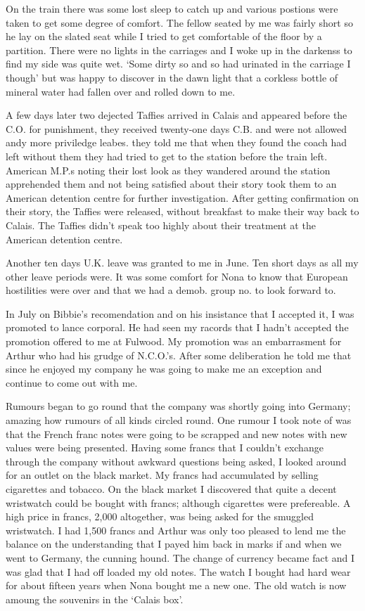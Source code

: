 On the train there was some lost sleep to catch up and various
postions were taken to get some degree of comfort. The fellow seated
by me was fairly short so he lay on the slated seat while I tried to
get comfortable of the floor by a partition. There were no lights in
the carriages and I woke up in the darkenss to find my side was quite
wet. `Some dirty so and so had urinated in the carriage I though' but
was happy to discover in the dawn light that a corkless bottle of
mineral water had fallen over and rolled down to me.

A few days later two dejected Taffies arrived in Calais and appeared
before the C.O. for punishment, they received twenty-one days C.B. and
were not allowed andy more priviledge leabes. they told me that when
they found the coach had left without them they had tried to get to
the station before the train left. American M.P.s noting their lost
look as they wandered around the station apprehended them and not
being satisfied about their story took them to an American detention
centre for further investigation. After getting confirmation on their
story, the Taffies were released, without breakfast to make their way
back to Calais. The Taffies didn't speak too highly about their
treatment at the American detention centre.

Another ten days U.K. leave was granted to me in June. Ten short days
as all my other leave periods were. It was some comfort for Nona to
know that European hostilities were over and that we had a
demob. group no. to look forward to.

In July on \sergeant Bibbie's recomendation and on his insistance that
I accepted it, I was promoted to lance corporal. He had seen my racords that I
hadn't accepted the promotion offered to me at Fulwood. My promotion
was an embarrasment for Arthur who had his grudge of N.C.O.'s. After
some deliberation he told me that since he enjoyed my company he was
going to make me an exception and continue to come out with me.

Rumours began to go round that the company was shortly going into
Germany; amazing how rumours of all kinds circled round. One rumour I
took note of was that the French franc notes were going to be scrapped
and new notes with new values were being presented. Having some
francs that I couldn't exchange through the company without awkward
questions being asked, I looked around for an outlet on the black
market. My francs had accumulated by selling cigarettes and tobacco. On
the black market I discovered that quite a decent wristwatch could be
bought with francs; although cigarettes were prefereable. A high price
in francs, 2,000 altogether, was being asked for the smuggled
wristwatch. I had 1,500 francs and Arthur was only too pleased to lend
me the balance on the understanding that I payed him back in marks if
and when we went to Germany, the cunning hound. The change of currency
became fact and I was glad that I had off loaded my old notes. The
watch I bought had hard wear for about fifteen years when Nona
bought me a new one. The old watch is now amoung the souvenirs in the
`Calais box'.
